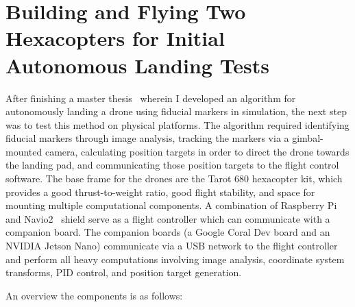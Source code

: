 \section{Building and Flying Two Hexacopters for Initial Autonomous Landing Tests}
\label{section:initial_hexacopters}

After finishing a master thesis~\cite{joshua_master_thesis} wherein I developed an algorithm for autonomously landing a drone using
fiducial markers in simulation, the next step was to test this method on physical platforms.
The algorithm required identifying fiducial markers through image analysis,
tracking the markers via a gimbal-mounted camera,
calculating position targets in order to direct the drone towards the landing pad,
and communicating those position targets to the flight control software.
The base frame for the drones are the Tarot 680 hexacopter kit, which provides a good thrust-to-weight ratio,
good flight stability,
and space for mounting multiple computational components.
A combination of Raspberry Pi and Navio2~\cite{navio2_website} shield serve as a flight controller
which can communicate with a companion board.
The companion boards (a Google Coral Dev board and an NVIDIA Jetson Nano) communicate via a USB network to the flight
controller and perform all heavy computations involving image analysis, coordinate system transforms, PID control,
and position target generation.

An overview the components is as follows:

